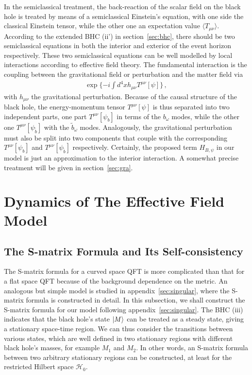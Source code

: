 \documentclass[12pt,a4paper]{article}
\begin{document}
In the semiclassical treatment, the
back-reaction of the scalar field on the black hole is treated by means of a semiclassical Einstein's equation, with one side the classical Einstein tensor,
while the other one an expectation value $\langle T_{\mu\nu}\rangle$. According to the extended BHC (ii') in section~\ref{sec:bhc}, there should be two semiclassical equations in both the interior and exterior of the event horizon respectively.
These two semiclassical equations can be well modelled by local interactions according to effective field theory.
The fundamental interaction is the coupling between the gravitational field or perturbation and the matter field via
\begin{equation}
\label{eq:27}
\begin{split}
\exp\{-i\int d^4xh_{\mu\nu}T^{\mu\nu}[\psi]\} \,,
\end{split}
\end{equation}
with $h_{\mu\nu}$ the gravitational perturbation. Because of the causal structure of the black hole, the energy-momentum tensor
$T^{\mu\nu}[\psi]$ is thus separated into two independent
parts, one part $T^{\mu\nu}[\psi_b]$ in terms of the $b_{\omega}$ modes, while the other one $T^{\mu\nu}[\psi_{\tilde{b}}]$ with the
$\tilde{b}_{\omega}$ modes. Analogously, the gravitational perturbation must also be split into two components that couple with the corresponding $T^{\mu\nu}[\psi_b]$ and $T^{\mu\nu}[\psi_{\tilde{b}}]$ respectively. Certainly, the proposed term
$H_{B,\psi}$ in our model is just an approximation to
the interior interaction. A somewhat precise treatment will
be given in section~\ref{sec:gra}.

\section{Dynamics of The Effective Field Model }
\label{sec:dynamics}


\subsection{The S-matrix Formula and Its Self-consistency}
\label{sec:S}
The S-matrix formula for a curved space QFT is more complicated than that for a flat space QFT because of the background dependence on the metric. An analogous but simple model is studied in appendix~\ref{sec:singular}, where the S-matrix formula is constructed in detail. In this subsection, we shall construct the S-matrix formula for our model following appendix~\ref{sec:singular}. The BHC (iii) indicates that the black hole's state $\arrowvert
M\rangle$ can be treated as a steady state, giving a stationary
space-time region. We can thus consider the transitions between
various states, which are well defined in two stationary regions with different black hole's masses, for example $M_1$ and $M_2$. In other words, an S-matrix formula between two arbitrary stationary regions can be constructed, at least for the restricted Hilbert space $\mathcal {H}_0$.
\end{document}

